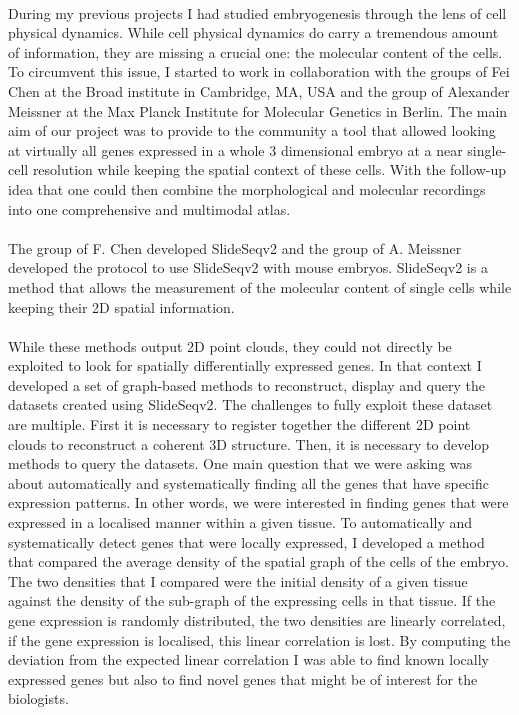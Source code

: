 \paragraph{}During my previous projects I had studied embryogenesis through the lens of cell physical dynamics.
While cell physical dynamics do carry a tremendous amount of information, they are missing a crucial one: the molecular content of the cells.
To circumvent this issue, I started to work in collaboration with the groups of Fei Chen at the Broad institute in Cambridge, MA, USA and the group of Alexander Meissner at the Max Planck Institute for Molecular Genetics in Berlin.
The main aim of our project was to provide to the community a tool that allowed looking at virtually all genes expressed in a whole 3 dimensional embryo at a near single-cell resolution while keeping the spatial context of these cells.
With the follow-up idea that one could then combine the morphological and molecular recordings into one comprehensive and multimodal atlas.
\paragraph{}The group of F. Chen developed SlideSeqv2 and the group of A. Meissner developed the protocol to use SlideSeqv2 with mouse embryos.
SlideSeqv2 is a method that allows the measurement of the molecular content of single cells while keeping their 2D spatial information.
\paragraph{}While these methods output 2D point clouds, they could not directly be exploited to look for spatially differentially expressed genes.
In that context I developed a set of graph-based methods to reconstruct, display and query the datasets created using SlideSeqv2.
The challenges to fully exploit these dataset are multiple.
First it is necessary to register together the different 2D point clouds to reconstruct a coherent 3D structure.
Then, it is necessary to develop methods to query the datasets.
One main question that we were asking was about automatically and systematically finding all the genes that have specific expression patterns.
In other words, we were interested in finding genes that were expressed in a localised manner within a given tissue.
To automatically and systematically detect genes that were locally expressed, I developed a method that compared the average density of the spatial graph of the cells of the embryo.
The two densities that I compared were the initial density of a given tissue against the density of the sub-graph of the expressing cells in that tissue.
If the gene expression is randomly distributed, the two densities are linearly correlated, if the gene expression is localised, this linear correlation is lost.
By computing the deviation from the expected linear correlation I was able to find known locally expressed genes but also to find novel genes that might be of interest for the biologists.
